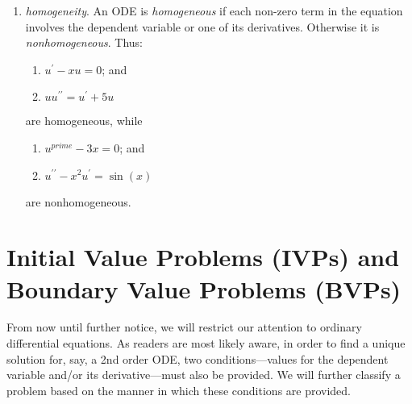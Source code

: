 \begin{enumerate}
\item \emph{homogeneity}.  An ODE is \emph{homogeneous} if each non-zero term in the equation involves the dependent variable or one of its derivatives.  Otherwise it is \emph{nonhomogeneous}.  Thus:
\begin{enumerate}
\item $u^{\prime} - xu = 0$; and
\item $u u^{\prime \prime} = u^{\prime} + 5u$
\end{enumerate}
are homogeneous, while
\begin{enumerate}
\item $u^{prime} - 3x = 0$; and
\item $u^{\prime \prime} - x^2u^{\prime} = \sin{(x)}$
\end{enumerate}
are nonhomogeneous.

\end{enumerate}


\section{Initial Value Problems (IVPs) and Boundary Value Problems (BVPs)}
From now until further notice, we will restrict our attention to ordinary differential equations.  As readers are most likely aware, in order to find a unique solution for, say, a 2nd order ODE, two conditions---values for the dependent variable and/or its derivative---must also be provided.  We will further classify a problem based on the manner in which these conditions are provided.

